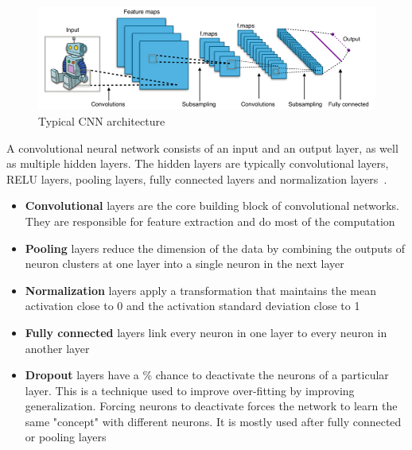 \begin{figure}[h]
	\centering
	\caption[Typical convolutional neural network architecture]{Typical CNN architecture~\cite{cnn_fig}}
	\label{fig:cnn}
	\includegraphics[width=1.1\textwidth, height=1.5\textheight, keepaspectratio]{"resources/typical_cnn"}
\end{figure}

\par
A convolutional neural network consists of an input and an output layer, as well as multiple hidden layers. The hidden layers are typically convolutional layers, RELU layers, pooling layers, fully connected layers and normalization layers~\cite{cnn_git}.

\begin{itemize}
	\item \textbf{Convolutional} layers are the core building block of convolutional networks. They are responsible for feature extraction and do most of the computation
	\item \textbf{Pooling} layers reduce the dimension of the data by combining the outputs of neuron clusters at one layer into a single neuron in the next layer
	\item \textbf{Normalization} layers apply a transformation that maintains the mean activation close to 0 and the activation standard deviation close to 1
	\item \textbf{Fully connected} layers link every neuron in one layer to every neuron in another layer
	\item \textbf{Dropout} layers have a \% chance to deactivate the neurons of a particular layer. This is a technique used to improve over-fitting by improving generalization. Forcing neurons to deactivate forces the network to learn the same "concept" with different neurons. It is mostly used after fully connected or pooling layers
\end{itemize}


